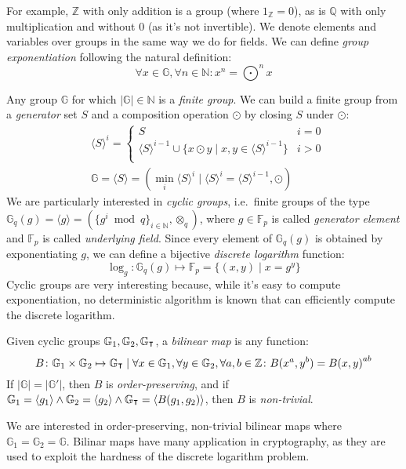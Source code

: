 \noindent For example, \(\mathbb{Z}\) with only addition is a group (where \(1_{\mathbb{Z}} = 0\)),
as is \(\mathbb{Q}\) with only multiplication and without \(0\) (as it's not invertible).
We denote elements and variables over groups in the same way we do for fields.
We can define \emph{group exponentiation} following the natural definition:
\[\forall x \in \mathbb{G}, \forall n \in \mathbb{N}\colon x^n = \bigodot^{n}{x}\]

Any group \(\mathbb{G}\) for which \(|\mathbb{G}| \in \mathbb{N}\) is a \emph{finite group}.
We can build a finite group from a \emph{generator} set \(S\) and a composition operation
\(\odot \) by closing \(S\) under \(\odot \):
\begin{align*}
	 & {\langle{S}\rangle}^i =
	\begin{cases}
		S                                                                                   & i = 0
		\\
		{\langle{S}\rangle}^{i-1} \cup \{x \odot y \mid x,y \in {\langle{S}\rangle}^{i-1}\} & i > 0
		\\
	\end{cases}
	\\
	 & \mathbb{G} = \langle{S}\rangle =
	(\min_{i}{{\langle{S}\rangle}^{i}} \mid {\langle{S}\rangle}^{i} = {\langle{S}\rangle}^{i-1}, \odot)
\end{align*}
We are particularly interested in \emph{cyclic groups}, i.e.\ finite groups of the type
\(\mathbb{G}_q(g) = \langle{g}\rangle = ({\{g^i \bmod q\}}_{i \in \mathbb{N}},
\otimes_q)\), where \(g \in \mathbb{F}_p\) is called \emph{generator element} and
\(\mathbb{F}_p\) is called \emph{underlying field}.
Since every element of \(\mathbb{G}_q(g)\) is obtained by exponentiating \(g\), we can define a
bijective \emph{discrete logarithm} function:
\[\log_g\colon \mathbb{G}_q(g) \mapsto \mathbb{F}_p = \{(x, y) \mid x = g^y\} \]
Cyclic groups are very interesting because, while it's easy to compute exponentiation, no
deterministic algorithm is known that can efficiently compute the discrete logarithm.
\begin{definition}
	Given cyclic groups \(\mathbb{G}_1, \mathbb{G}_2, \mathbb{G}_{\transpose}\), a
	\emph{bilinear map} is any function:
	\[B\colon \mathbb{G}_1 \times \mathbb{G}_2 \mapsto \mathbb{G}_{\transpose} \mid
		\forall x \in \mathbb{G}_1, \forall y \in \mathbb{G}_2, \forall a,b \in \mathbb{Z}\colon
		B(x^a, y^b) = {B(x, y)}^{ab}\]
	If \(|\mathbb{G}| = |\mathbb{G}'|\), then \(B\) is \emph{order-preserving}, and if
	\(\mathbb{G}_1 = \langle{g_1}\rangle \land \mathbb{G}_2 = \langle{g_2}\rangle \land
	\mathbb{G}_{\transpose} = \langle{B(g_1, g_2)}\rangle \), then \(B\) is \emph{non-trivial}.
\end{definition}

\noindent We are interested in order-preserving, non-trivial bilinear maps where
\(\mathbb{G}_1 = \mathbb{G}_2 = \mathbb{G}\).
Bilinar maps have many application in cryptography, as they are used to exploit the hardness of 
the discrete logarithm problem.
